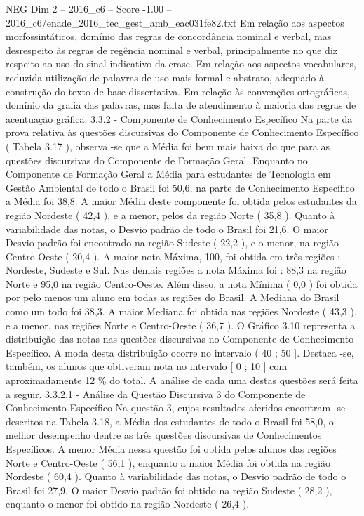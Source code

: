 \begin{textsample}{NEG Dim 2 – 2016\_c6 – Score -1.00 – 2016\_c6/enade\_2016\_tec\_gest\_amb\_eac031fe82.txt}
Em relação aos aspectos morfossintáticos, domínio das regras de concordância nominal e verbal, mas desrespeito às regras de regência nominal e verbal, principalmente no que diz respeito ao uso do sinal indicativo da crase.
Em relação aos aspectos vocabulares, reduzida utilização de palavras de uso mais formal e abstrato, adequado à construção do texto de base dissertativa.
Em relação às convenções ortográficas, domínio da grafia das palavras, mas falta de atendimento à maioria das regras de acentuação gráfica. 3.3.2 - Componente de Conhecimento Específico Na parte da prova relativa às questões discursivas do Componente de Conhecimento Específico ( Tabela 3.17 ), observa -se que a Média foi bem mais baixa do que para as questões discursivas do Componente de Formação Geral.
Enquanto no Componente de Formação Geral a Média para estudantes de Tecnologia em Gestão Ambiental de todo o Brasil foi 50,6, na parte de Conhecimento Específico a Média foi 38,8.
A maior Média deste componente foi obtida pelos estudantes da região Nordeste ( 42,4 ), e a menor, pelos da região Norte ( 35,8 ).
Quanto à variabilidade das notas, o Desvio padrão de todo o Brasil foi 21,6.
O maior Desvio padrão foi encontrado na região Sudeste ( 22,2 ), e o menor, na região Centro-Oeste ( 20,4 ).
A maior nota Máxima, 100, foi obtida em três regiões : Nordeste, Sudeste e Sul.
Nas demais regiões a nota Máxima foi : 88,3 na região Norte e 95,0 na região Centro-Oeste.
Além disso, a nota Mínima ( 0,0 ) foi obtida por pelo menos um aluno em todas as regiões do Brasil.
A Mediana do Brasil como um todo foi 38,3.
A maior Mediana foi obtida nas regiões Nordeste ( 43,3 ), e a menor, nas regiões Norte e Centro-Oeste ( 36,7 ).
O Gráfico 3.10 representa a distribuição das notas nas questões discursivas no Componente de Conhecimento Específico.
A moda desta distribuição ocorre no intervalo ( 40 ; 50 ].
Destaca -se, também, os alunos que obtiveram nota no intervalo [ 0 ; 10 ] com aproximadamente 12 \% do total.
A análise de cada uma destas questões será feita a seguir. 3.3.2.1 - Análise da Questão Discursiva 3 do Componente de Conhecimento Específico Na questão 3, cujos resultados aferidos encontram -se descritos na Tabela 3.18, a Média dos estudantes de todo o Brasil foi 58,0, o melhor desempenho dentre as três questões discursivas de Conhecimentos Específicos.
A menor Média nessa questão foi obtida pelos alunos das regiões Norte e Centro-Oeste ( 56,1 ), enquanto a maior Média foi obtida na região Nordeste ( 60,4 ).
Quanto à variabilidade das notas, o Desvio padrão de todo o Brasil foi 27,9.
O maior Desvio padrão foi obtido na região Sudeste ( 28,2 ), enquanto o menor foi obtido na região Nordeste ( 26,4 ).

\end{textsample}
